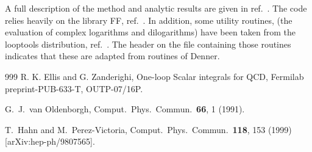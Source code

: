 \documentclass{article}
\begin{document}
A full description of the method and analytic results are given in
ref.~\cite{EZ}.  The code relies heavily on the library FF,
ref.~\cite{van Oldenborgh:1990yc}.  In addition, some utility
routines, (the evaluation of complex logarithms and dilogarithms) have
been taken from the looptools distribution, ref.~\cite{Hahn:1998yk}.
The header on the file containing those routines indicates that these
are adapted from routines of Denner.

\begin{thebibliography}{999}
R. K. Ellis and G. Zanderighi,
One-loop Scalar integrals for QCD,
Fermilab preprint-PUB-633-T, OUTP-07/16P.

  G.~J.~van Oldenborgh,
  Comput.\ Phys.\ Commun.\  {\bf 66}, 1 (1991).

  T.~Hahn and M.~Perez-Victoria,
  Comput.\ Phys.\ Commun.\  {\bf 118}, 153 (1999)
  [arXiv:hep-ph/9807565].


\end{thebibliography}
\end{document}
